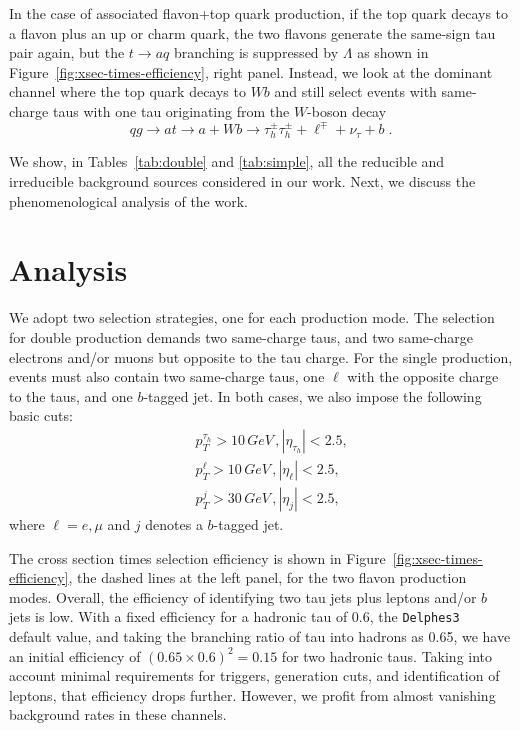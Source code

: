 \documentclass[prd,amsfonts,onecolumn,superscriptaddress,aps,nofootinbib,11pt]{revtex4-1}
\begin{document}
In the case of associated flavon+top quark production,  if the top quark decays to a flavon plus an up or charm quark, the two flavons generate the same-sign tau pair again, but the $t\to aq$ branching is suppressed by $\Lambda$ as shown in Figure~\ref{fig:xsec-times-efficiency}, right panel. Instead, we look at the dominant channel where the top quark decays to $Wb$ and still select events with same-charge taus with one tau originating from the $W$-boson decay
\begin{equation}
    qg \to a t \to a+W b\to \tau_h^{\pm} \tau_h^{\pm} + \ell^{\mp} + \nu_\tau + b \;.
\end{equation}

We show, in Tables~\ref{tab:double} and \ref{tab:simple}, all the reducible and irreducible background sources considered in our work. Next, we discuss the phenomenological analysis of the work.


\section{Analysis}\label{sec:analysis}

We adopt two selection strategies, one for each production mode. The selection for double production demands two same-charge taus, and two same-charge electrons and/or muons but opposite to the tau charge.  For the single production, events must also contain two same-charge taus, one $\ell$ with the opposite charge to the taus, and one $b$-tagged jet.  In both cases, we also impose the following basic cuts: %
\begin{eqnarray}
    && p_T^{\tau_h}  > 10 \, \si{GeV} \,, \left| \eta_{\tau_h} \right| < 2.5, \nonumber \\
    && p_T^{\ell}  > 10 \, \si{GeV} \,, \left| \eta_{\ell} \right| < 2.5, \nonumber \\
    && p_T^{j} >  30 \, \si{GeV} \,, \left| \eta_j \right| <  2.5, 
    \label{eq:basic_cuts}
\end{eqnarray}
where $\ell = e, \mu$ and $j$ denotes a $b$-tagged jet.

 The cross section times selection efficiency is shown in Figure~\ref{fig:xsec-times-efficiency}, the dashed lines at the left panel, for the two flavon production modes. Overall, the efficiency of identifying two tau jets plus leptons and/or $b$ jets is low. With a fixed efficiency for a hadronic tau of 0.6, the \texttt{Delphes3}~\cite{deFavereau:2013fsa} default value, and taking the branching ratio of tau into hadrons as 0.65, we have an initial efficiency of $(0.65\times 0.6)^2=0.15$ for two hadronic taus. Taking into account minimal requirements for triggers, generation cuts, and identification of leptons, that efficiency drops further. However, we profit from almost vanishing background rates in these channels.
\end{document}

